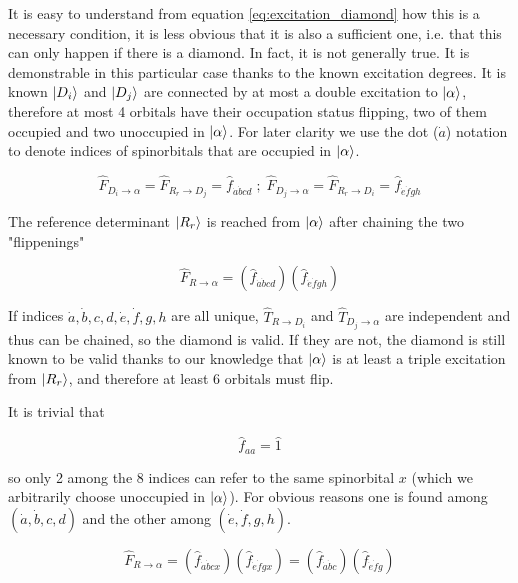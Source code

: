 \documentclass[./thesis.tex]{subfiles}
\begin{document}
It is easy to understand from equation \ref{eq:excitation_diamond} how this is a necessary condition, it is less obvious that it is also a sufficient one, i.e. that this can only happen if there is a diamond. In fact, it is not generally true. It is demonstrable in this particular case thanks to the known excitation degrees. It is known $\ket {D_i}$ and $\ket {D_j}$ are connected by at most a double excitation to ${\ket{\alpha}}$, therefore at most 4 orbitals have their occupation status flipping, two of them occupied and two unoccupied in ${\ket{\alpha}}$. For later clarity we use the dot ($\dot a$) notation to denote indices of spinorbitals that are occupied in ${\ket{\alpha}}$.

\begin{equation}
\hat F_{D_i \rightarrow \alpha} = \hat F_{R_r \rightarrow D_j} = \hat f_{\dot a \dot bcd} \; ; \; \hat F_{D_j \rightarrow \alpha} = \hat F_{R_r \rightarrow D_i} = \hat f_{\dot e \dot fgh}
\end{equation}

The reference determinant $\ket {R_r}$ is reached from ${\ket{\alpha}}$ after chaining the two "flippenings"

\begin{equation}
\hat F_{R \rightarrow \alpha} = (\hat f_{\dot a \dot bcd})(\hat f_{\dot e \dot fgh})
\end{equation}

If indices $\dot a,\dot b,c,d,\dot e,\dot f,g,h$ are all unique, $\hat T_{R \rightarrow D_i}$ and $\hat T_{D_j \rightarrow \alpha}$ are independent and thus can be chained, so the diamond is valid. If they are not, the diamond is still known to be valid thanks to our knowledge that ${\ket{\alpha}}$ is at least a triple excitation from $\ket {R_r}$, and therefore at least 6 orbitals must flip. 

It is trivial that

\begin{equation}
\hat f_{aa} = \hat 1
\end{equation}

so only 2 among the 8 indices can refer to the same spinorbital $x$ (which we arbitrarily choose unoccupied in ${\ket{\alpha}}$). For obvious reasons one is found among $(\dot a,\dot b,c,d)$ and the other among $(\dot e,\dot f,g,h)$.

\begin{equation}
\hat F_{R \rightarrow \alpha} = (\hat f_{\dot a \dot bcx})(\hat f_{\dot e \dot fgx}) = (\hat f_{\dot a \dot bc})(\hat f_{\dot e \dot fg})
\end{equation}
\end{document}
